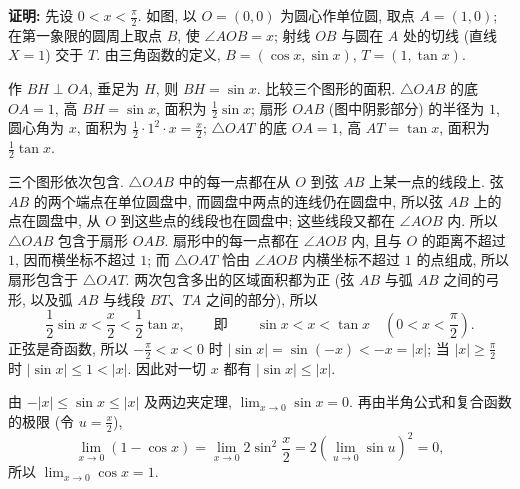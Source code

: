 \documentclass[UTF8,openany]{ctexbook}
\theoremstyle{chinesetextbook}
\newenvironment{cnproof}{\par\indent\textbf{证明:} \ignorespaces}{\par}
\begin{document}
\begin{cnproof}
先设 $\displaystyle0<x<\frac\pi2$. 如图, 以 $O=(0,0)$ 为圆心作单位圆, 取点 $A=(1,0)$; 在第一象限的圆周上取点 $B$, 使 $\angle AOB=x$; 射线 $OB$ 与圆在 $A$ 处的切线 (直线 $X=1$) 交于 $T$. 由三角函数的定义, $B=(\cos x,\sin x)$, $T=(1,\tan x)$.
\begin{center}
\end{center}
作 $BH\perp OA$, 垂足为 $H$, 则 $BH=\sin x$. 比较三个图形的面积. $\triangle OAB$ 的底 $OA=1$, 高 $BH=\sin x$, 面积为 $\displaystyle\frac12\sin x$; 扇形 $OAB$ (图中阴影部分) 的半径为 $1$, 圆心角为 $x$, 面积为 $\displaystyle\frac12\cdot1^2\cdot x=\frac x2$; $\triangle OAT$ 的底 $OA=1$, 高 $AT=\tan x$, 面积为 $\displaystyle\frac12\tan x$.

三个图形依次包含. $\triangle OAB$ 中的每一点都在从 $O$ 到弦 $AB$ 上某一点的线段上. 弦 $AB$ 的两个端点在单位圆盘中, 而圆盘中两点的连线仍在圆盘中, 所以弦 $AB$ 上的点在圆盘中, 从 $O$ 到这些点的线段也在圆盘中; 这些线段又都在 $\angle AOB$ 内. 所以 $\triangle OAB$ 包含于扇形 $OAB$. 扇形中的每一点都在 $\angle AOB$ 内, 且与 $O$ 的距离不超过 $1$, 因而横坐标不超过 $1$; 而 $\triangle OAT$ 恰由 $\angle AOB$ 内横坐标不超过 $1$ 的点组成, 所以扇形包含于 $\triangle OAT$. 两次包含多出的区域面积都为正 (弦 $AB$ 与弧 $AB$ 之间的弓形, 以及弧 $AB$ 与线段 $BT$、$TA$ 之间的部分), 所以
\[
\frac12\sin x<\frac x2<\frac12\tan x,\qquad\text{即}\qquad\sin x<x<\tan x\quad\left(0<x<\frac\pi2\right).
\]
正弦是奇函数, 所以 $\displaystyle-\frac\pi2<x<0$ 时 $|\sin x|=\sin(-x)<-x=|x|$; 当 $\displaystyle|x|\ge\frac\pi2$ 时 $|\sin x|\le1<|x|$. 因此对一切 $x$ 都有 $|\sin x|\le|x|$.

由 $-|x|\le\sin x\le|x|$ 及两边夹定理, $\displaystyle\lim_{x\to0}\sin x=0$. 再由半角公式和复合函数的极限 (令 $\displaystyle u=\frac x2$),
\[
\lim_{x\to0}(1-\cos x)=\lim_{x\to0}2\sin^2\frac x2=2\left(\lim_{u\to0}\sin u\right)^2=0,
\]
所以 $\displaystyle\lim_{x\to0}\cos x=1$.
\end{cnproof}
\end{document}
